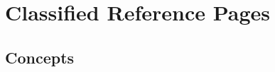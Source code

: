 
\label{ChapterRefAlgebraicConcepts}



\section{Classified Reference Pages}

\subsection*{Concepts}
 \\
